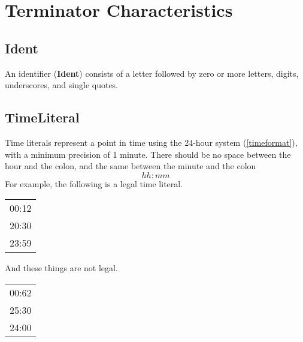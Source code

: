 \begin{grammar}
\end{grammar}

\section{Terminator Characteristics}
\subsection{Ident}\label{Ident}
An identifier (\textbf{Ident}) consists of a letter followed by zero or more letters, digits, underscores, and single quotes.
\begin{grammar}
\end{grammar}

\subsection{TimeLiteral}\label{TimeLiteral}
Time literals represent a point in time using the 24-hour system (\ref{timeformat}), with a minimum precision of 1 minute.
There should be no space between the hour and the colon, and the same between the minute and the colon
\begin{equation}\label{timeformat}
    hh:mm
\end{equation}
For example, the following is a legal time literal.

\begin{center}
    \begin{tabular}{c}
        00:12 \\
        20:30 \\
        23:59 \\
    \end{tabular}
\end{center}
And these things are not legal.

\begin{center}
    \begin{tabular}{c}
        00:62 \\
        25:30 \\
        24:00 \\
    \end{tabular}
\end{center}

